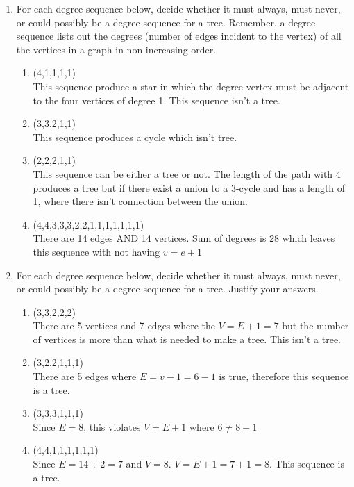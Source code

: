 \documentclass[11pt,a4paper]{article}
\newcommand\setItemNumber[1]{\setcounter{enumi}{\numexpr#1-1\relax}}
\begin{document}
        \begin{enumerate}

        \setItemNumber{2}
        \item For each degree sequence below, decide whether it must always, must never, or could possibly be a degree sequence for a tree. Remember, a degree sequence lists out the degrees (number of edges incident to the vertex) of all the vertices in a graph in non-increasing order.\\
            \begin{enumerate}
                \item (4,1,1,1,1)\\
                    This sequence produce a star in which the  degree vertex must be adjacent to the four vertices of degree 1. This sequence isn't a tree.
                \item (3,3,2,1,1)\\
                    This sequence produces a cycle which isn't tree.
                \item (2,2,2,1,1)\\
                    This sequence can be either a tree or not. The length of the path with 4 produces a tree but if there exist a union to a 3-cycle and has a length of 1, where there isn't connection between the union.
                \item (4,4,3,3,3,2,2,1,1,1,1,1,1,1)\\
                    There are 14 edges AND 14 vertices. Sum of degrees is 28 which leaves this sequence with not having $v = e + 1$
            \end{enumerate}

        \item For each degree sequence below, decide whether it must always, must never, or could possibly be a degree sequence for a tree. Justify your answers.

            \begin{enumerate}
                \item (3,3,2,2,2)\\
                    There are 5 vertices and 7 edges where the $V = E + 1 = 7$ but the number of vertices is more than what is needed to make a tree. This isn't a tree. 
                \item (3,2,2,1,1,1)\\
                    There are 5 edges where $E = v - 1 = 6 - 1$ is true, therefore this sequence is a tree.                    
                \item (3,3,3,1,1,1)\\
                    Since $E = 8$, this violates $V = E + 1$ where $6\neq 8 - 1$
                \item (4,4,1,1,1,1,1,1)\\
                    Since $E = 14\div 2 = 7$ and $V = 8$. $V = E + 1 = 7 + 1 = 8$. This sequence is a tree.
            \end{enumerate}


\end{enumerate}
\end{document}
